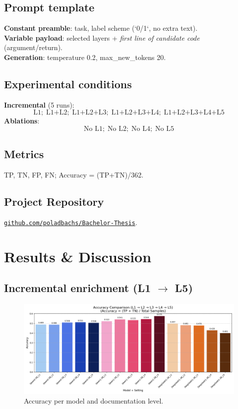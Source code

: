 \documentclass[a4paper]{usiinfbachelorproject}
\begin{document}
\subsection{Prompt template}
\textbf{Constant preamble}: task, label scheme (`0/1`, no extra text).\\
\textbf{Variable payload}: selected layers + \textit{first line of candidate code} (argument/return).\\
\textbf{Generation}: temperature 0.2, max\_new\_tokens 20.

\subsection{Experimental conditions}
\textbf{Incremental} (5 runs):
\[
\text{L1};\; \text{L1+L2};\; \text{L1+L2+L3};\; \text{L1+L2+L3+L4};\; \text{L1+L2+L3+L4+L5}
\]
\textbf{Ablations}:
\[
\text{No L1};\; \text{No L2};\; \text{No L4};\; \text{No L5}
\]

\subsection{Metrics}
TP, TN, FP, FN; Accuracy = (TP+TN)/362.

\subsection{Project Repository}
\href{https://github.com/poladbachs/Bachelor-Thesis}{\texttt{github.com/poladbachs/Bachelor-Thesis}}.

\section{Results \& Discussion}\label{sec:results}

\subsection{Incremental enrichment (L1 $\rightarrow$ L5)}

\begin{figure}[H]\centering
  \includegraphics[width=0.95\linewidth]{figures/accuracy_comparison.png}
  \caption{Accuracy per model and documentation level.}
  \label{fig:acc-l1-l5}
\end{figure}
\end{document}
